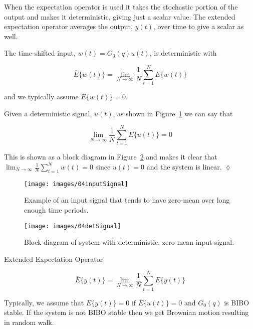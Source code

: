 When the expectation operator is used it takes the stochastic portion of the output and makes it deterministic, giving just a scalar value.
The extended expectation operator averages the output, $y(t)$, over time to give a scalar as well.

The time-shifted input, $w(t)=G_0(q)u(t)$, is deterministic with

\begin{equation*}
\bar{E}\{w(t)\} = \lim_{N\to\infty}\frac{1}{N}\sum_{t=1}^N E\{w(t)\}
\end{equation*}

and we typically assume $\bar{E}\{w(t)\}=0$.

\begin{example}
Given a deterministic signal, $u(t)$, as shown in Figure~\ref{fig:04inputSignal} we can say that

\begin{equation*}
\lim_{N\to\infty}\frac{1}{N}\sum_{t=1}^N E\{u(t)\} = 0
\end{equation*}

This is shown as a block diagram in Figure~\ref{fig:04detSignal} and makes it clear that $\lim_{N\to\infty}\frac{1}{N}\sum_{t=1}^N w(t)=0$ since $u(t)=0$ and the system is linear.
$\lozenge$
\end{example}
\begin{figure}[ht!]
\centering
\texttt{[image: images/04inputSignal]}
\caption{Example of an input signal that tends to have zero-mean over long enough time periods.}%
\label{fig:04inputSignal}
\end{figure}

\begin{figure}[ht!]
\centering
\texttt{[image: images/04detSignal]}
\caption{Block diagram of system with deterministic, zero-mean input signal.}%
\label{fig:04detSignal}
\end{figure}

\begin{definition}{Extended Expectation Operator}

\begin{equation*}
\bar{E}\{y(t)\}=\lim_{N\to\infty}\frac{1}{N}\sum_{t=1}^N E\{y(t)\}
\end{equation*}

Typically, we assume that $E\{y(t)\}=0$ if $\bar{E}\{u(t)\}=0$ and $G_0(q)$ is BIBO stable.
If the system is not BIBO stable then we get Brownian motion resulting in random walk.
\end{definition}

